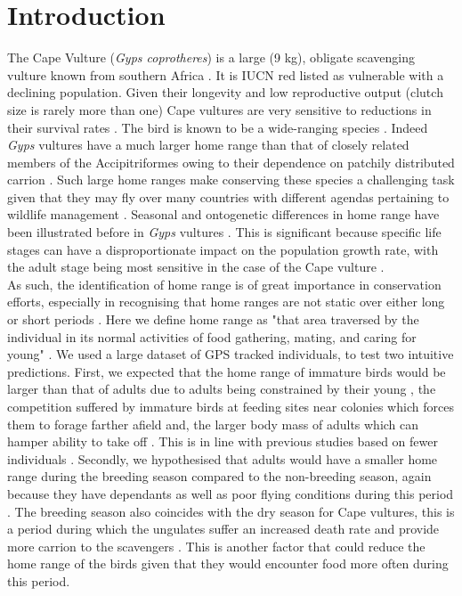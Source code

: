 \section{\uppercase{I}ntroduction}

	The Cape Vulture (\textit{Gyps coprotheres}) is a large (9 kg), obligate scavenging vulture known from southern Africa \citep{mundy1992vultures}. It is IUCN red listed as vulnerable with a declining population. Given their longevity and low reproductive output (clutch size is rarely more than one) Cape vultures are very sensitive to reductions in their survival rates \citep{phipps2013power,monadjem2014effect}. The bird is known to be a wide-ranging species \citep{bamford2007ranging}. Indeed \textit{Gyps} vultures \citep{monsarrat2013predictability} have a much larger home range than that of closely related members of the Accipitriformes \citep{peery2000factors} owing to their dependence on patchily distributed carrion \citep{ruxton2004obligate}. Such large home ranges make conserving these species a challenging task given that they may fly over many countries with different agendas pertaining to wildlife management \citep{lambertucci2014apex}. Seasonal and ontogenetic differences in home range have been illustrated before in \textit{Gyps} vultures \citep{monsarrat2013predictability, phipps2013power}. This is significant because specific life stages can have a disproportionate impact on the population growth rate, with the adult stage being most sensitive in the case of the Cape vulture \citep{monadjem2012survival,monadjem2014effect}.  \\
 \indent As such, the identification of home range is of great importance in conservation efforts, especially in recognising that home ranges are not static over either long or short periods \citep{burt1943territoriality}.  Here we define home range as "that area traversed by the individual in its normal activities of food gathering, mating, and caring for young" \citep{burt1943territoriality}. We used a large dataset of GPS tracked individuals, to test two intuitive predictions. First, we expected that the home range of immature birds would be larger than that of adults due to adults being constrained by their young \citep{mundy1992vultures}, the competition suffered by immature birds at feeding sites near colonies which forces them to forage farther afield and, the larger body mass of adults which can hamper ability to take off  \citep{robertson1986feeding,mundy1992vultures}. This is in line with previous studies based on fewer individuals \citep{mundy1992vultures, bamford2007ranging, phipps2013power}. Secondly, we hypothesised that adults would have a smaller home range during the breeding season compared to the non-breeding season, again because they have dependants as well as poor flying conditions during this period \citep{mundy1992vultures, monsarrat2013predictability}. The breeding season also coincides with the dry season for Cape vultures, this is a period during which the ungulates suffer an increased death rate and provide more carrion to the scavengers \citep{mundy1992vultures}. This is another factor that could reduce the home range of the birds given that they would encounter food more often during this period. 

